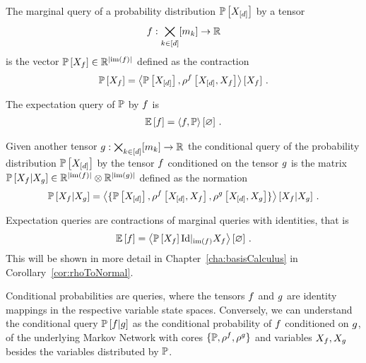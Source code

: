 \begin{definition}\label{def:queries}
	The marginal query of a probability distribution $\mathbb{P}\left[X_{[d]}\right]$ by a tensor 
		\[ f : \bigtimes_{k\in[d]}[m_{k}] \rightarrow \mathbb{R} \]
	is the vector $\mathbb{P}\left[X_{f}\right] \in \mathbb{R}^{\left|\mathrm{im}\left(f\right)\right|}$ defined as the contraction
	\begin{align*}
		\mathbb{P}\left[X_{f}\right] = \left\langle \mathbb{P}\left[X_{[d]}\right],\rho^{f}\left[X_{[d]},X_{f}\right]\right\rangle \left[ X_{f} \right] \, . 
	\end{align*}
	
	The expectation query of $\mathbb{P}$ by $f$ is 
	\begin{align*}
		\mathbb{E}\left[f\right] = \left\langle f, \mathbb{P}\right\rangle \left[ \varnothing \right] \, . 
	\end{align*}
	
	Given another tensor $g: \bigtimes_{k\in[d]}[m_{k}] \rightarrow \mathbb{R} $ the conditional query of the probability distribution $\mathbb{P}\left[X_{[d]}\right]$ by the tensor $f$ conditioned on the tensor $g$ is the matrix $\mathbb{P}\left[X_{f}|X_{g}\right]\in\mathbb{R}^{\left|\mathrm{im}\left(f\right)\right|}\otimes \mathbb{R}^{\left|\mathrm{im}\left(g\right)\right|}$ defined as the normation
	\begin{align*}
		\mathbb{P}\left[X_{f}|X_{g}\right] 
		= \left\langle \{
		\mathbb{P}\left[X_{[d]}\right],\rho^{f}\left[X_{[d]},X_{f}\right],\rho^{g}\left[X_{[d]},X_{g}\right]
		\}\right\rangle \left[ 
		X_{f} | X_{g}
		 \right] \, . 
	\end{align*}
\end{definition}

Expectation queries are contractions of marginal queries with identities, that is
	\[ \mathbb{E}\left[f\right] = \left\langle \mathbb{P}\left[X_{f}\right] {\mathrm{Id}}|_{\mathrm{im}\left(f\right)}{X_{f}} \right\rangle \left[ \varnothing \right] \, . \]
This will be shown in more detail in Chapter~\ref{cha:basisCalculus} in Corollary~\ref{cor:rhoToNormal}.

Conditional probabilities are queries, where the tensors $f$ and $g$ are identity mappings in the respective variable state spaces.
Conversely, we can understand the conditional query $\mathbb{P}\left[f|g\right]$ as the conditional probability of $f$ conditioned on $g$, of the underlying Markov Network with cores $\{\mathbb{P}, \rho^{f}, \rho^{g} \}$ and variables $X_{f},X_{g}$ besides the variables distributed by $\mathbb{P}$.

